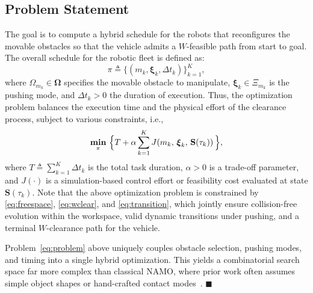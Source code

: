 \subsection{Problem Statement}\label{subsec:objective}
The goal is to compute a hybrid schedule for the robots that reconfigures the movable
obstacles so that the vehicle admits a $W$-feasible path from start to goal.
The overall schedule for the robotic fleet is defined as:
\begin{equation}\label{eq:schedule}
\pi\triangleq\big\{(m_k,\boldsymbol{\xi}_k,\Delta t_k)\big\}_{k=1}^{K},
\end{equation}
where $\Omega_{m_k}\in \boldsymbol{\Omega}$ specifies the movable obstacle to manipulate,
$\boldsymbol{\xi}_k\in\Xi_{m_k}$ is the pushing mode, and
$\Delta t_k>0$ the duration of execution.
Thus, the optimization problem balances the execution time and the physical effort
of the clearance process, subject to various constraints, i.e.,
\begin{equation}\label{eq:problem}
\underset{\pi}{\textbf{min}}\ \Big{\{} T+\alpha\sum_{k=1}^{K}
J\!\left(m_k,\,\boldsymbol{\xi}_k,\,\mathbf{S}(\tau_k)\right)\Big{\}},
\end{equation}
where $T\triangleq\sum_{k=1}^{K}\Delta t_k$ is the total task duration,
$\alpha>0$ is a trade-off parameter, and $J(\cdot)$ is a simulation-based
control effort or feasibility cost evaluated at state $\mathbf{S}(\tau_k)$.
Note that the above optimization
problem is constrained by \eqref{eq:freespace}, \eqref{eq:wclear}, and
\eqref{eq:transition}, which jointly ensure collision-free evolution within
the workspace, valid dynamic transitions under pushing, and a terminal
$W$-clearance path for the vehicle.

\begin{remark}\label{remark:uniqueness}
  Problem~\eqref{eq:problem} above uniquely couples obstacle selection, pushing
  modes, and timing into a single hybrid optimization. This yields a
  combinatorial search space far more complex than classical NAMO, where
  prior work often assumes simple object shapes or hand-crafted contact
  modes~\cite{wang2006multi,goyal1989limit,chen2015occlusion,tang2023combinatorial}.
  \hfill $\blacksquare$
\end{remark}
